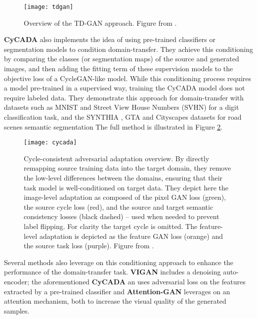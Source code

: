 \begin{figure}
	\centering
	\texttt{[image: tdgan]}
	\caption{Overview of the TD-GAN approach. Figure from \citet{Zhang2018c}.}
	\label{fig:tdgan}
\end{figure}

\textbf{CyCADA} \citep{Hoffman2018} also implements the idea of using pre-trained classifiers or segmentation models to condition domain-transfer.  They achieve this conditioning by comparing the classes (or segmentation maps) of the source and generated images, and then adding the fitting term of these supervision models to the objective loss of a \ac{CycleGAN}-like model. While this conditioning process requires a model pre-trained in a supervised way, training the CyCADA model does not require labeled data. They demonstrate this approach for domain-transfer with datasets such as \ac{MNIST} \citep{LeCun1998a} and Street View House Numbers (SVHN) \citep{Netzer2011} for a digit classification task, and the SYNTHIA \citep{Ros2016}, GTA \citep{Richter2016} and Cityscapes \citep{Cordts2015} datasets for road scenes semantic segmentation The full method is illustrated in Figure \ref{fig:cycada}.


\begin{figure}
	\centering
	\texttt{[image: cycada]}
	\caption[Cycle-consistent adversarial adaptation (CyCADA) overview]{Cycle-consistent adversarial adaptation overview. By directly remapping source training data into the target domain, they remove the low-level differences between the domains, ensuring that their task model is well-conditioned on target data. They depict here the image-level adaptation as composed of the pixel GAN loss ({\color{green}green}), the source cycle loss ({\color{red}red}), and the source and target semantic consistency losses (black dashed) – used when needed to prevent label flipping. For clarity the target cycle is omitted. The feature-level adaptation is depicted as the feature GAN loss ({\color{orange}orange}) and the source task loss ({\color{purple}purple}). Figure from \citet{Hoffman2018}.}
	\label{fig:cycada}
\end{figure}

Several methods also leverage on this conditioning approach to enhance the performance of the domain-transfer task. \textbf{VIGAN} \citep{Shang2017} includes a denoising auto-encoder; the aforementioned \textbf{CyCADA} an uses adversarial loss on the features extracted by a pre-trained classifier and \textbf{Attention-GAN} \citep{Chen2018b} leverages on an attention mechanism, both to increase the visual quality of the generated samples.


